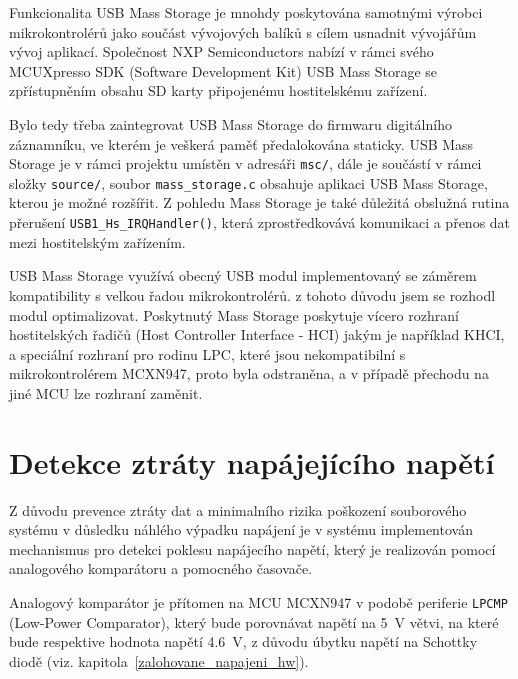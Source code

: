 Funkcionalita USB Mass Storage je mnohdy poskytována samotnými výrobci mikrokontrolérů jako součást vývojových balíků s cílem usnadnit vývojářům vývoj aplikací. Společnost NXP Semiconductors nabízí v rámci svého MCUXpresso SDK (Software Development Kit) USB Mass Storage se zpřístupněním obsahu SD karty připojenému hostitelskému zařízení.

Bylo tedy třeba zaintegrovat USB Mass Storage do firmwaru digitálního záznamníku, ve kterém je veškerá paměť předalokována staticky. USB Mass Storage je v rámci projektu umístěn v adresáři \texttt{msc/}, dále je součástí v rámci složky \texttt{source/}, soubor \texttt{mass\_storage.c} obsahuje aplikaci USB Mass Storage, kterou je možné rozšířit. Z pohledu Mass Storage je také důležitá obslužná rutina přerušení \texttt{USB1\_Hs\_IRQHandler()}, která zprostředkovává komunikaci a přenos dat mezi hostitelským zařízením.

USB Mass Storage využívá obecný USB modul implementovaný se záměrem kompatibility s velkou řadou mikrokontrolérů. z tohoto důvodu jsem se rozhodl modul optimalizovat. Poskytnutý Mass Storage poskytuje vícero rozhraní hostitelských řadičů (Host Controller Interface - HCI) jakým je například KHCI, a speciální rozhraní pro rodinu LPC, které jsou nekompatibilní s mikrokontrolérem MCXN947, proto byla odstraněna, a v případě přechodu na jiné MCU lze rozhraní zaměnit. 

\section{Detekce ztráty napájejícího napětí}
Z důvodu prevence ztráty dat a minimalního rizika poškození souborového systému v důsledku náhlého výpadku napájení je v systému implementován mechanismus pro detekci poklesu napájecího napětí, který je realizován pomocí analogového komparátoru a pomocného časovače.  

Analogový komparátor je přítomen na MCU MCXN947 v podobě periferie \texttt{LPCMP} (Low-Power Comparator), který bude porovnávat napětí na \SI{5}{\volt} větvi, na které bude respektive hodnota napětí \SI{4.6}{\volt}, z důvodu úbytku napětí na Schottky diodě (viz. kapitola~\ref{zalohovane_napajeni_hw}).

